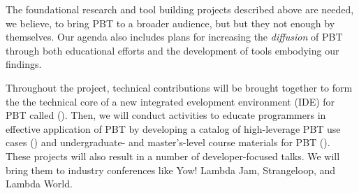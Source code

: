 {
}



The foundational research and tool building projects described above
are needed, we believe, to bring PBT to a broader audience, but
but they not enough by themselves. Our agenda also
includes plans for increasing the {\em diffusion} of PBT through both
educational efforts and the development of tools embodying our
findings.

Throughout the project, technical contributions will be brought together to
form the the technical core of a new integrated evelopment environment (IDE) for PBT called \tyche{}
().  Then, we will conduct activities to educate
programmers in effective application of PBT by developing a catalog of
high-leverage PBT use cases () and undergraduate- and
master's-level course materials for PBT ().
These projects will
also result in a number of developer-focused talks. We will bring them
to industry conferences like Yow! Lambda Jam, Strangeloop, and
Lambda World.

